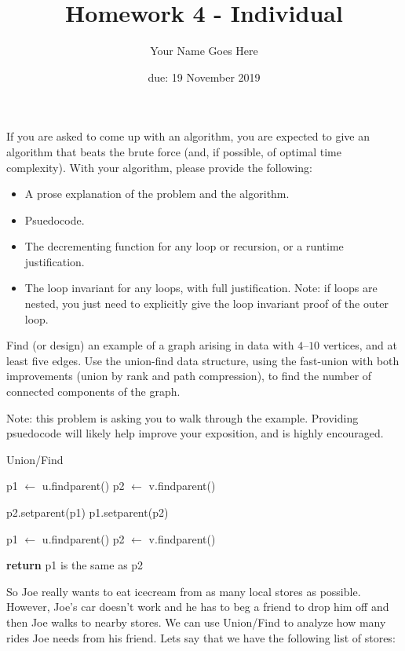 \documentclass{article}
\author{Your Name Goes Here}
\date{due: 19 November 2019}
\title{Homework 4 - Individual}
\begin{document}
\maketitle

If you are asked to come up with an algorithm, you are expected to give an
algorithm that beats the brute force (and, if possible, of optimal time
complexity).
With your algorithm, please provide the following:
\begin{itemize}
\item A prose explanation of the problem and the algorithm.
\item Psuedocode.
\item The decrementing function for any loop or recursion, or a runtime
justification.
\item The loop invariant for any loops, with full justification.  Note: if
loops are nested, you just need to explicitly give the loop invariant
proof of the outer loop.
\end{itemize}

\nextprob
Find (or design) an example of a graph arising in data
with $4$--$10$ vertices, and at least five
edges.  Use the union-find data structure, using the fast-union with both
improvements (union by rank and path compression), to find the number of
connected components of the graph.

Note: this problem is asking you to walk through the example.  Providing
psuedocode will likely help improve your exposition, and is highly encouraged.

\begin{algorithm}
\caption{Union/Find}\label{guests}
\begin{algorithmic}[1]
\State p1 $\gets$ u.findparent()
\State p2 $\gets$ v.findparent()

\State p2.setparent(p1)
\Else
\State p1.setparent(p2)
\EndIf
\EndFunction
\end{algorithmic}
\begin{algorithmic}[1]
\State p1 $\gets$ u.findparent()
\State p2 $\gets$ v.findparent()

\State \textbf{return} p1 is the same as p2
\EndFunction
\end{algorithmic}
\end{algorithm}

So Joe really wants to eat icecream from as many local stores as possible. However,
Joe's car doesn't work and he has to beg a friend to drop him off and then Joe walks to nearby stores.
We can use Union/Find to analyze how many rides Joe needs from his friend. Lets say that we have the following list of stores:
\end{document}
